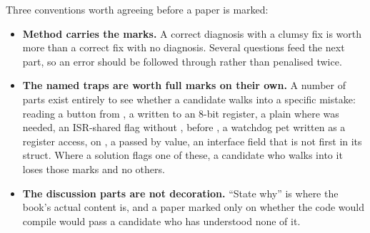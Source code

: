 Three conventions worth agreeing before a paper is marked:
\begin{itemize}
  \item \textbf{Method carries the marks.} A correct diagnosis with a clumsy fix is worth more than
    a correct fix with no diagnosis. Several questions feed the next part, so an error should be
    followed through rather than penalised twice.
  \item \textbf{The named traps are worth full marks on their own.} A number of parts exist entirely
    to see whether a candidate walks into a specific mistake: reading a button from , a
     written to an 8-bit register, a plain \code{=} where \code{|=} was needed, an
    ISR-shared flag without ,  before , a watchdog pet written
    as a register access, \code{^=} on , a  passed by value, an interface
    field that is not first in its struct. Where a solution flags one of these, a candidate who
    walks into it loses those marks and no others.
  \item \textbf{The discussion parts are not decoration.} ``State why'' is where the book's actual
    content is, and a paper marked only on whether the code would compile would pass a candidate
    who has understood none of it.
\end{itemize}
